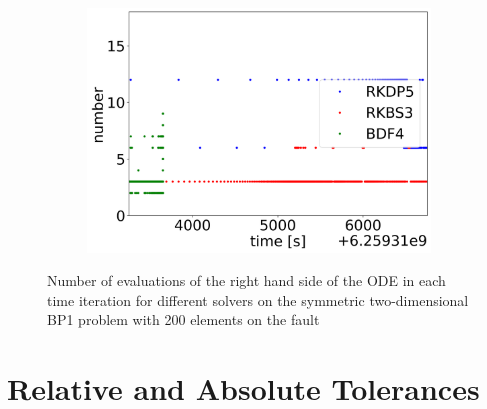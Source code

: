 \documentclass{report}
\begin{document}
\begin{figure}[H]
\begin{subfigure}{0.32\textwidth}
    \end{subfigure}
    \begin{subfigure}{0.32\textwidth}
    	\centering
    	\includegraphics[width=1\textwidth]{images/TANDEMtimeEvolutionRHSearthquake.png}
    \end{subfigure}
    \caption{Number of evaluations of the right hand side of the ODE in each time iteration for different solvers on the symmetric two-dimensional BP1 problem with 200 elements on the fault}
    \label{fig:timeEvolutionTANDEM_RHS}
\end{figure}

\section{Relative and Absolute Tolerances}
\end{document}
